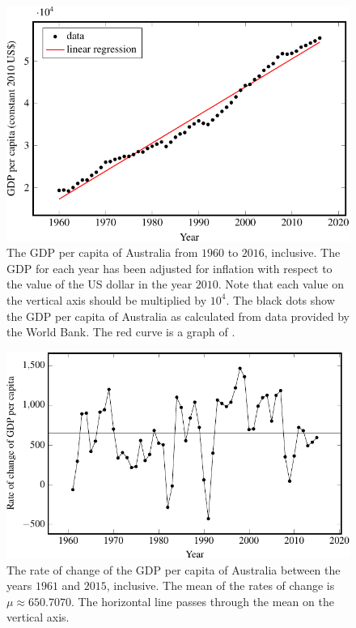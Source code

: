 \documentclass[a4paper,oneside,12pt]{article}
\begin{document}
\begin{problem}
{\begin{solution}
\begin{figure}[!htbp]
\centering
\includegraphics[scale=1.1]{image/12/Australia-gdp-per-capita.pdf}
\caption{%
  The GDP per capita of Australia from $1960$ to $2016$, inclusive.
  The GDP for each year has been adjusted for inflation with respect
  to the value of the US dollar in the year $2010$.  Note that each
  value on the vertical axis should be multiplied by $10^4$.  The
  black dots show the GDP per capita of Australia as calculated from
  data provided by the World Bank.  The red curve is a graph of
  .
}
\label{fig:logarithm:Australia_GDP_per_capita}
\end{figure}

\begin{figure}[!htbp]
\centering
\includegraphics[scale=1.1]{image/12/Australia-gdp-per-capita-delta.pdf}
\caption{%
  The rate of change of the GDP per capita of Australia between the
  years $1961$ and $2015$, inclusive.  The mean of the rates of change
  is $\mu \approx 650.7070$.  The horizontal line passes through the
  mean on the vertical axis.
}
\label{fig:logarithm:Australia_GDP_per_capita_rate}
\end{figure}


\end{solution}}
\end{problem}
\end{document}
